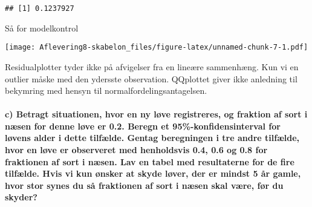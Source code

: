 \documentclass[
]{article}
\newenvironment{Shaded}{\begin{snugshade}}{\end{snugshade}}
\newcommand{\AttributeTok}[1]{\textcolor[rgb]{0.77,0.63,0.00}{#1}}
\newcommand{\DecValTok}[1]{\textcolor[rgb]{0.00,0.00,0.81}{#1}}
\newcommand{\FunctionTok}[1]{\textcolor[rgb]{0.00,0.00,0.00}{#1}}
\newcommand{\NormalTok}[1]{#1}
\newcommand{\OtherTok}[1]{\textcolor[rgb]{0.56,0.35,0.01}{#1}}
\newcommand{\SpecialCharTok}[1]{\textcolor[rgb]{0.00,0.00,0.00}{#1}}
\begin{document}
\begin{verbatim}
## [1] 0.1237927
\end{verbatim}

Så for modelkontrol

\begin{Shaded}
\end{Shaded}

\texttt{[image: Aflevering8-skabelon\_files/figure-latex/unnamed-chunk-7-1.pdf]}

Residualplotter tyder ikke på afvigelser fra en lineære sammenhæng. Kun
vi en outlier måske med den ydersste observation. QQplottet giver ikke
anledning til bekymring med hensyn til normalfordelingsantagelsen.

\hypertarget{c-betragt-situationen-hvor-en-ny-luxf8ve-registreres-og-fraktion-af-sort-i-nuxe6sen-for-denne-luxf8ve-er-0.2.-beregn-et-95-konfidensinterval-for-luxf8vens-alder-i-dette-tilfuxe6lde.-gentag-beregningen-i-tre-andre-tilfuxe6lde-hvor-en-luxf8ve-er-observeret-med-henholdsvis-0.4-0.6-og-0.8-for-fraktionen-af-sort-i-nuxe6sen.-lav-en-tabel-med-resultaterne-for-de-fire-tilfuxe6lde.-hvis-vi-kun-uxf8nsker-at-skyde-luxf8ver-der-er-mindst-5-uxe5r-gamle-hvor-stor-synes-du-suxe5-fraktionen-af-sort-i-nuxe6sen-skal-vuxe6re-fuxf8r-du-skyder}{%
\paragraph{c) Betragt situationen, hvor en ny løve registreres, og
fraktion af sort i næsen for denne løve er 0.2. Beregn et
95\%-konfidensinterval for løvens alder i dette tilfælde. Gentag
beregningen i tre andre tilfælde, hvor en løve er observeret med
henholdsvis 0.4, 0.6 og 0.8 for fraktionen af sort i næsen. Lav en tabel
med resultaterne for de fire tilfælde. Hvis vi kun ønsker at skyde
løver, der er mindst 5 år gamle, hvor stor synes du så fraktionen af
sort i næsen skal være, før du
skyder?}\label{c-betragt-situationen-hvor-en-ny-luxf8ve-registreres-og-fraktion-af-sort-i-nuxe6sen-for-denne-luxf8ve-er-0.2.-beregn-et-95-konfidensinterval-for-luxf8vens-alder-i-dette-tilfuxe6lde.-gentag-beregningen-i-tre-andre-tilfuxe6lde-hvor-en-luxf8ve-er-observeret-med-henholdsvis-0.4-0.6-og-0.8-for-fraktionen-af-sort-i-nuxe6sen.-lav-en-tabel-med-resultaterne-for-de-fire-tilfuxe6lde.-hvis-vi-kun-uxf8nsker-at-skyde-luxf8ver-der-er-mindst-5-uxe5r-gamle-hvor-stor-synes-du-suxe5-fraktionen-af-sort-i-nuxe6sen-skal-vuxe6re-fuxf8r-du-skyder}}
\end{document}
